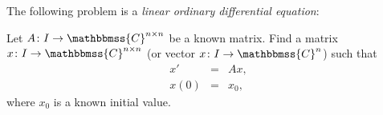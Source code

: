 \documentclass[12pt]{article}
\newcommand{\C}{\mathbbmss{C}}
\begin{document}
The following problem is a \emph{linear ordinary differential equation}:

Let $A\colon I \to \C^{n\times n}$ be a known matrix. Find
a matrix $x\colon I \to \C^{n\times n}$ 
(or vector $x\colon I \to \C^n$) such that 
\begin{eqnarray*}
  x'&=& Ax,\\
  x(0)&=& x_0,
\end{eqnarray*}
where $x_0$ is a known initial value.
\end{document}
